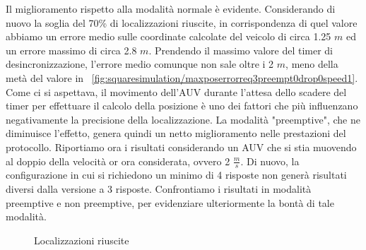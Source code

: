 \documentclass[Lau,binding=0.6cm]{sapthesis}
\begin{document}
Il miglioramento rispetto alla modalità normale è evidente. Considerando di nuovo la soglia del 70\% di localizzazioni riuscite, in corrispondenza di quel valore abbiamo un errore medio sulle coordinate calcolate del veicolo di circa 1.25 $m$ ed un errore massimo di circa 2.8 $m$. Prendendo il massimo valore del timer di desincronizzazione, l'errore medio comunque non sale oltre i 2 $m$, meno della metà del valore in ~\ref{fig:squaresimulation/maxposerrorreq3preempt0drop0speed1}.
Come ci si aspettava, il movimento dell'AUV durante l'attesa dello scadere del timer per effettuare il calcolo della posizione è uno dei fattori che più influenzano negativamente la precisione della localizzazione. La modalità "preemptive", che ne diminuisce l'effetto, genera quindi un netto miglioramento nelle prestazioni del protocollo.
Riportiamo ora i risultati considerando un AUV che si stia muovendo al doppio della velocità or ora considerata, ovvero 2 $\frac{m}{s}$.
Di nuovo, la configurazione in cui si richiedono un minimo di 4 risposte non generà risultati diversi dalla versione a 3 risposte.
Confrontiamo i risultati in modalità preemptive e non preemptive, per evidenziare ulteriormente la bontà di tale modalità.

\begin{figure}[H]
    \centering
    \hfill
    \caption{Localizzazioni riuscite}
\end{figure}
\end{document}
